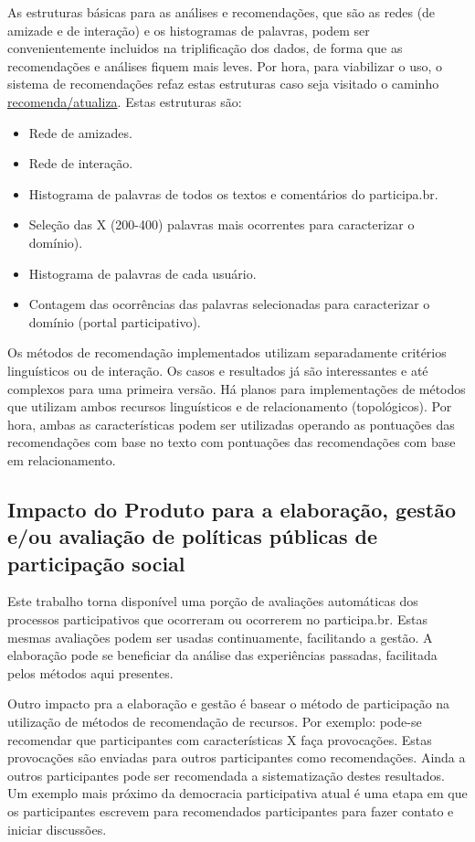 \documentclass[12pt]{article}
\begin{document}
As estruturas básicas para as análises e recomendações, que são as redes (de amizade e de interação) e os histogramas de palavras, podem ser convenientemente incluidos na triplificação dos dados, de forma que as recomendações e análises fiquem mais leves. Por hora, para viabilizar o uso, o sistema de recomendações refaz estas estruturas caso seja visitado o caminho \url{recomenda/atualiza}. Estas estruturas são:
\begin{itemize}
    \item Rede de amizades.
    \item Rede de interação.
    \item Histograma de palavras de todos os textos e comentários do participa.br.
    \item Seleção das X (200-400) palavras mais ocorrentes para caracterizar o domínio).
    \item Histograma de palavras de cada usuário.
    \item Contagem das ocorrências das palavras selecionadas para caracterizar o domínio (portal participativo).
\end{itemize}

Os métodos de recomendação implementados utilizam separadamente critérios linguísticos ou de interação. Os casos e resultados
já são interessantes e até complexos para uma primeira versão. Há planos para implementações de métodos
que utilizam ambos recursos linguísticos e de relacionamento (topológicos). Por hora, ambas as características podem ser
utilizadas operando as pontuações das recomendações com base no texto com pontuações das recomendações com base em relacionamento.

\subsection{Impacto do Produto para a elaboração, gestão e/ou avaliação de políticas públicas de participação social}
Este trabalho torna disponível uma porção de avaliações automáticas dos processos participativos que ocorreram ou ocorrerem no participa.br. Estas mesmas avaliações podem ser usadas continuamente, facilitando a gestão. A elaboração pode se beneficiar da análise das experiências passadas, facilitada pelos métodos aqui presentes.

Outro impacto pra a elaboração e gestão é basear o método de participação na utilização de métodos de recomendação de recursos. Por exemplo: pode-se recomendar que participantes com características X faça provocações. Estas provocações são enviadas para outros participantes como recomendações. Ainda a outros participantes pode ser recomendada a sistematização destes resultados. Um exemplo mais próximo da democracia participativa atual é uma etapa em que os participantes escrevem para recomendados participantes para fazer contato e iniciar discussões.
\end{document}
